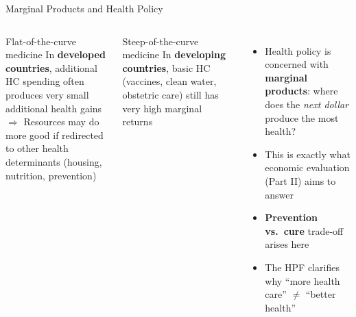 \documentclass[aspectratio=169, 12pt]{beamer}
\begin{document}
\begin{frame}{Marginal Products and Health Policy}
  \begin{columns}
      \begin{block}{Flat-of-the-curve medicine}
        \small In \textbf{developed countries}, additional HC spending often produces very small
        additional health gains\\[0.2em]
        $\Rightarrow$ Resources may do more good if redirected to other health determinants
        (housing, nutrition, prevention)
      \end{block}
      \vspace{0.3em}
      \begin{alertblock}{Steep-of-the-curve medicine}
        \small In \textbf{developing countries}, basic HC (vaccines, clean water, obstetric care)
        still has very high marginal returns
      \end{alertblock}
      \small
      \begin{itemize}
        \item Health policy is concerned with \textbf{marginal products}: where does the
              \emph{next dollar} produce the most health?
        \item This is exactly what economic evaluation (Part II) aims to answer
        \item \textbf{Prevention vs.\ cure} trade-off arises here
        \item The HPF clarifies why ``more health care'' $\neq$ ``better health''
      \end{itemize}
  \end{columns}
\end{frame}
\end{document}
